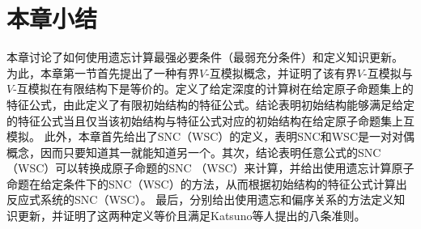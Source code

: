 \section{本章小结}\label{sec:chapter04-conclusion}

本章讨论了如何使用遗忘计算最强必要条件（最弱充分条件）和定义知识更新。
为此，本章第一节首先提出了一种有界$V$-互模拟概念，并证明了该有界$V$-互模拟与$V$-互模拟在有限结构下是等价的。定义了给定深度的计算树在给定原子命题集上的特征公式，由此定义了有限初始结构的特征公式。结论表明初始结构能够满足给定的特征公式当且仅当该初始结构与特征公式对应的初始结构在给定原子命题集上互模拟。
此外，本章首先给出了SNC（WSC）的定义，表明SNC和WSC是一对对偶概念，因而只要知道其一就能知道另一个。其次，结论表明任意公式的SNC（WSC）可以转换成原子命题的SNC （WSC）来计算，并给出使用遗忘计算原子命题在给定条件下的SNC（WSC）的方法，从而根据初始结构的特征公式计算出反应式系统的SNC（WSC）。
最后，分别给出使用遗忘和偏序关系的方法定义知识更新，并证明了这两种定义等价且满足Katsuno等人提出的八条准则。

